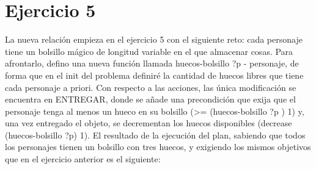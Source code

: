 \section{Ejercicio 5}

La nueva relación empieza en el ejercicio 5 con el siguiente reto: cada personaje tiene un bolsillo mágico de longitud variable en el que almacenar cosas. Para afrontarlo, defino una nueva función llamada huecos-bolsillo ?p - personaje, de forma que en el init del problema definiré la cantidad de huecos libres que tiene cada personaje a priori. Con respecto a las acciones, las única modificación se encuentra en ENTREGAR, donde se añade una precondición que exija que el personaje tenga al menos un hueco en su bolsillo (>= (huecos-bolsillo ?p ) 1) y, una vez entregado el objeto, se decrementan los huecos disponibles (decrease (huecos-bolsillo ?p) 1). El resultado de la ejecución del plan, sabiendo que todos los personajes tienen un bolsillo con tres huecos, y exigiendo los mismos objetivos que en el ejercicio anterior es el siguiente:

